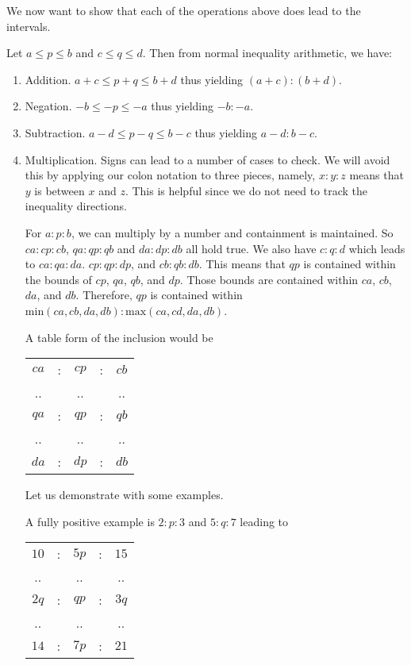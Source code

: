 \documentclass[12pt]{article}
\theoremstyle{remark}
\begin{document}
We now want to show that each of the operations above does lead to the intervals. 

Let $a \leq p \leq b$ and $c\leq  q \leq  d$. Then from normal inequality arithmetic, we have: 

\begin{enumerate}
    \item Addition.   $a +c \leq  p + q \leq  b +d$ thus yielding $(a+c):(b+d)$.
    \item Negation.  $-b \leq -p \leq -a$ thus yielding $-b:-a$.
    \item Subtraction.  $a - d \leq p-q \leq b -c$  thus yielding $a-d:b-c$.
    \item Multiplication. Signs can lead to a number of cases to check. We will avoid this by  applying our colon notation to three pieces, namely,  $x:y:z$ means that $y$ is between $x$ and $z$. This is helpful since we do not need to track the inequality directions. 
    
    For $a:p:b$, we can multiply by a number and containment is maintained. So $ca:cp:cb$, $qa: qp: qb$ and $da:dp:db$ all hold true. We also have $c:q:d$ which leads to $ca:qa:da$. $cp:qp:dp$, and $cb:qb:db$. This means that $qp$ is contained within the bounds of $cp$, $qa$, $qb$, and $dp$. Those bounds are contained within $ca$, $cb$, $da$, and $db$. Therefore, $qp$ is contained within $\mathrm{min}(ca, cb, da, db):\mathrm{max}(ca, cd, da, db)$. 
    
    A table form of the inclusion would be 
    
    \begin{tabular}{ccccc}
        $ca$ &:& $cp$ &:& $cb$ \\
        .. & & .. & & .. \\
        $qa$ &:& $qp$ &:& $qb$\\
        .. & & .. & & .. \\
         $da$ &:& $dp$&:& $db$
    \end{tabular}
    
    Let us demonstrate with some examples. 
    
    A fully positive example is $2:p:3$ and $5:q:7$ leading to 
    
     \begin{tabular}{ccccc}
        $10$ &:& $5p$ &:& $15$ \\
        .. & & .. & & .. \\
        $2q$ &:& $qp$ &:& $3q$\\
        .. & & .. & & .. \\
         $14$ &:& $7p$&:& $21$
    \end{tabular}
    

\end{enumerate}
\end{document}
